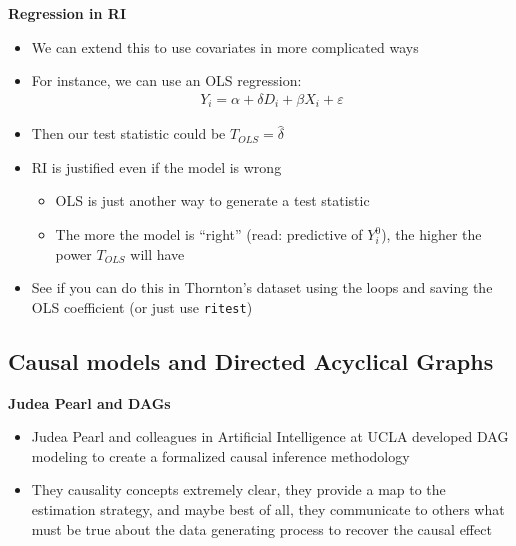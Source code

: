 \documentclass[notes=show]{beamer}
\begin{document}
\begin{frame}[plain]
\begin{center}
\textbf{Regression in RI}
\end{center}

\begin{itemize}
\item We can extend this to use covariates in more complicated ways
\item For instance, we can use an OLS regression:
\begin{eqnarray*}
Y_i = \alpha + \delta D_i + \beta X_i +  \varepsilon
\end{eqnarray*}
\item Then our test statistic could be $T_{OLS} = \widehat{\delta}$
\item RI is justified even if the model is wrong
	\begin{itemize}
	\item OLS is just another way to generate a test statistic
	\item The more the model is ``right'' (read: predictive of $Y_i^0$), the higher the power $T_{OLS}$ will have
	\end{itemize}
\item See if you can do this in Thornton's dataset using the loops and saving the OLS coefficient (or just use \texttt{ritest})
\end{itemize}

\end{frame}

\subsection{Causal models and Directed Acyclical Graphs}

\begin{frame}
	
	\begin{center}
	\textbf{Judea Pearl and DAGs}
	\end{center}
	
	\begin{itemize}
	\item Judea Pearl and colleagues in Artificial Intelligence at UCLA developed DAG modeling to create a formalized causal inference methodology
	\item They causality concepts extremely clear, they provide a map to the estimation strategy, and maybe best of all, they communicate to others what must be true about the data generating process to recover the causal effect
	\end{itemize}

\end{frame}
\end{document}
